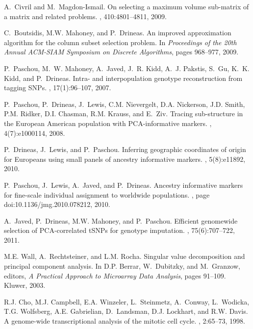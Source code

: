 \documentclass[twoside]{article}
\begin{document}
\begin{small}
\begin{thebibliography}{100}
A.~Civril and M.~Magdon-Ismail.
\newblock On selecting a maximum volume sub-matrix of a matrix and related
  problems.
, 410:4801--4811, 2009.

C.~Boutsidis, M.W. Mahoney, and P.~Drineas.
\newblock An improved approximation algorithm for the column subset selection
  problem.
\newblock In {\em Proceedings of the 20th Annual ACM-SIAM Symposium on Discrete
  Algorithms}, pages 968--977, 2009.

P.~Paschou, M.~W. Mahoney, A.~Javed, J.~R. Kidd, A.~J. Pakstis, S.~Gu, K.~K.
  Kidd, and P.~Drineas.
\newblock Intra- and interpopulation genotype reconstruction from tagging
  {SNP}s.
, 17(1):96--107, 2007.

P.~Paschou, P.~Drineas, J.~Lewis, C.M. Nievergelt, D.A. Nickerson, J.D. Smith,
  P.M. Ridker, D.I. Chasman, R.M. Krauss, and E.~Ziv.
\newblock Tracing sub-structure in the {E}uropean {A}merican population with
  {PCA}-informative markers.
, 4(7):e1000114, 2008.

P.~Drineas, J.~Lewis, and P.~Paschou.
\newblock Inferring geographic coordinates of origin for {E}uropeans using
  small panels of ancestry informative markers.
, 5(8):e11892, 2010.

P.~Paschou, J.~Lewis, A.~Javed, and P.~Drineas.
\newblock Ancestry informative markers for fine-scale individual assignment to
  worldwide populations.
, page doi:10.1136/jmg.2010.078212,
  2010.

A.~Javed, P.~Drineas, M.W. Mahoney, and P.~Paschou.
\newblock Efficient genomewide selection of {PCA}-correlated {tSNPs} for
  genotype imputation.
, 75(6):707--722, 2011.

M.E. Wall, A.~Rechtsteiner, and L.M. Rocha.
\newblock Singular value decomposition and principal component analysis.
\newblock In D.P. Berrar, W.~Dubitzky, and M.~Granzow, editors, {\em A
  Practical Approach to Microarray Data Analysis}, pages 91--109. Kluwer, 2003.

R.J. Cho, M.J. Campbell, E.A. Winzeler, L.~Steinmetz, A.~Conway, L.~Wodicka,
  T.G. Wolfsberg, A.E. Gabrielian, D.~Landsman, D.J. Lockhart, and R.W. Davis.
\newblock A genome-wide transcriptional analysis of the mitotic cell cycle.
, 2:65--73, 1998.


\end{thebibliography}
\end{small}
\end{document}
